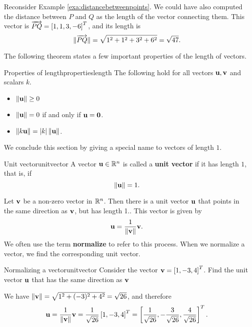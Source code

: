 Reconsider Example \ref{exa:distancebetweenpoints}. We could have also
computed the distance between $P$ and $Q$ as the length of the vector
connecting them. This vector is $\overrightarrow{PQ} = \left[1,1,3,-6\right]^T$,
and its length is
\[
  \|\overrightarrow{PQ}\| = \sqrt{1^2+1^2+3^2+6^2} = \sqrt{47}.
\]

The following theorem states a few important properties of the length
of vectors.

\begin{theorem}{Properties of length}{propertieslength}
  The following hold for all vectors $\mbox{\bf u},\mbox{\bf v}$ and scalars $k$.
  \begin{itemize}
  \item $\|\mbox{\bf u}\|\geq 0$
  \item $\|\mbox{\bf u}\|=0$ if and only if $\mbox{\bf u}=\mbox{\bf 0}$.
  \item $\|k\mbox{\bf u}\| = |k|\,\|\mbox{\bf u}\|$.
  \end{itemize}
\end{theorem}

We conclude this section by giving a special name to vectors of length
$1$.

\begin{definition}{Unit vector}{unitvector}
  A vector\/ $\mbox{\bf u}\in\mathbb{R}^n$ is called a
  \textbf{unit vector} if it has
  length $1$, that is, if
  \begin{equation*}
    \|\mbox{\bf u}\| = 1.
  \end{equation*}
\end{definition}

Let $\mbox{\bf v}$ be a non-zero vector in $\mathbb{R}^{n}$. Then there is a unit
vector $\mbox{\bf u}$ that points in the same direction as $\mbox{\bf v}$, but
has length 1.. This vector is
given by
\begin{equation*}
\mbox{\bf u} = \frac{1}{\|\mbox{\bf v}\|} \mbox{\bf v}.
\end{equation*}
We often use the term \textbf{normalize} to refer
to this process. When we normalize a vector, we find the corresponding
unit vector.

\begin{example}{Normalizing a vector}{unitvector}
  Consider the vector $\mbox{\bf v} = \left[1, -3, 4\right]^T$. Find the unit
  vector $\mbox{\bf u}$ that has the same direction as $\mbox{\bf v}$
\end{example}

\begin{solution}
  We have $\|\mbox{\bf v}\| = \sqrt{ 1^2 + (-3)^2 + 4^2} =
  \sqrt{26}$, and therefore
  \begin{equation*}
    \mbox{\bf u}
    = \frac{1}{\|\mbox{\bf v}\|} \mbox{\bf v}
    = \frac{1}{\sqrt{26}} \left[1, -3, 4\right]^T
    = \left[\frac{1}{\sqrt{26}}, -\frac{3}{\sqrt{26}}, \frac{4}{\sqrt{26}}\right]^T.
  \end{equation*}
\end{solution}

